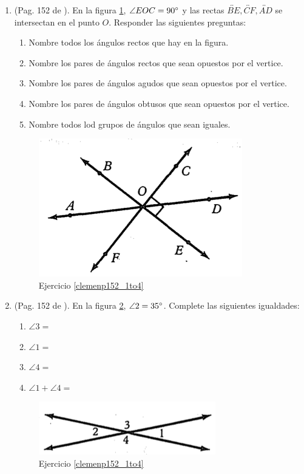 \begin{enumerate}
	\item \label{clemenp152_1to4} (Pag. 152 de \cite{clemens}). En la figura \ref{figclemenp147_1to4},  $\angle EOC = 90\degree$ y las rectas $\overleftrightarrow{BE},\overleftrightarrow{CF},\overleftrightarrow{AD}$ se intersectan en el punto $O$. Responder las siguientes preguntas:
	\begin{enumerate}[label=\Alph*) ]
		\item Nombre todos los ángulos rectos que hay en la figura.
		\item Nombre los pares de ángulos rectos que sean opuestos por el vertice.
		\item Nombre los pares de ángulos agudos que sean opuestos por el vertice.
		\item Nombre los pares de ángulos obtusos que sean opuestos por el vertice.
		\item Nombre todos lod grupos de ángulos que sean iguales.							
	\end{enumerate}
	\begin{figure}[H]
		\centering
		\includegraphics[width=0.5\linewidth]{Geometria/imgs/clemenp147_1to4}
		\caption{Ejercicio \ref{clemenp152_1to4}}
		\label{figclemenp147_1to4}
	\end{figure}
	
	\item \label{clemenp152_5to8} (Pag. 152 de \cite{clemens}). En la figura \ref{figclemenp147_5to8},  $\angle 2 = 35\degree$. Complete las siguientes igualdades:
	\begin{enumerate}[label=\Alph*) ]
		\item $\angle 3 = $
		\item $\angle 1 = $
		\item $\angle 4 = $								
		\item $\angle 1 +\angle 4 = $			
	\end{enumerate}
	\begin{figure}[H]
		\centering
		\includegraphics[width=0.5\linewidth]{Geometria/imgs/clemenp147_5to8}
		\caption{Ejercicio \ref{clemenp152_1to4}}
		\label{figclemenp147_5to8}
	\end{figure}
	

\end{enumerate}
